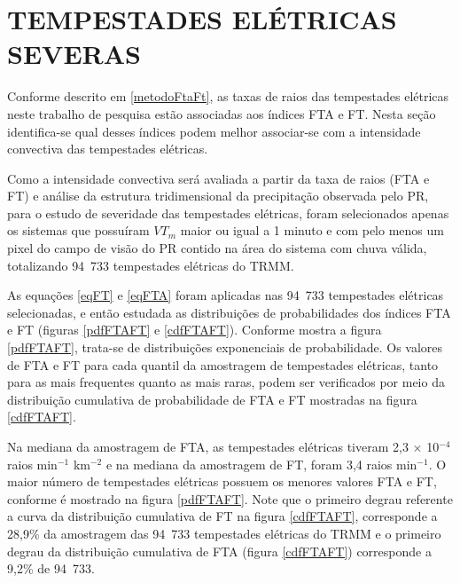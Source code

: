 \chapter{TEMPESTADES ELÉTRICAS SEVERAS}

Conforme descrito em \ref{metodoFtaFt}, as taxas de raios das tempestades elétricas neste trabalho de pesquisa estão associadas aos índices FTA e FT. Nesta seção identifica-se qual desses índices podem melhor associar-se com a intensidade convectiva das tempestades elétricas.

Como a intensidade convectiva será avaliada a partir da taxa de raios (FTA e FT) e análise da estrutura tridimensional da precipitação observada pelo PR, para o estudo de severidade das tempestades elétricas, foram selecionados apenas os sistemas que possuíram $VT_m$ maior ou igual a 1 minuto e com pelo menos um pixel do campo de visão do PR contido na área do sistema com chuva válida, totalizando {94~733} tempestades elétricas do TRMM. 


As equações \ref{eqFT} e \ref{eqFTA} foram aplicadas nas {94~733} tempestades elétricas selecionadas, e então estudada as distribuições de probabilidades dos índices FTA e FT (figuras \ref{pdfFTAFT} e \ref{cdfFTAFT}). Conforme mostra a figura \ref{pdfFTAFT}, trata-se de distribuições exponenciais de probabilidade. Os valores de FTA e FT para cada quantil da amostragem de tempestades elétricas, tanto para as mais frequentes quanto as mais raras, podem ser verificados por meio da distribuição cumulativa de probabilidade de FTA e FT mostradas na figura \ref{cdfFTAFT}. 

Na mediana da amostragem de FTA,  as tempestades elétricas tiveram 2,3 $\times$ 10$^{-4}$ raios min$^{-1}$ km$^{-2}$  e na mediana da amostragem de FT, foram 3,4 raios min$^{-1}$. O maior número de tempestades elétricas possuem os menores valores FTA e FT, conforme é mostrado na figura \ref{pdfFTAFT}. Note que o primeiro degrau referente a curva da distribuição cumulativa de FT na figura \ref{cdfFTAFT}, corresponde a 28,9\% da amostragem das {94~733} tempestades elétricas do TRMM e o primeiro degrau da distribuição cumulativa de FTA (figura \ref{cdfFTAFT}) corresponde a 9,2\% de {94~733}. 

